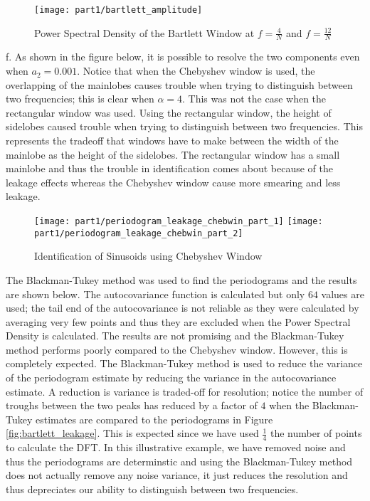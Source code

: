 \begin{figure}[H]
\centering{}
\texttt{[image: part1/bartlett\_amplitude]}
\caption{Power Spectral Density of the Bartlett Window at $f=\frac{4}{N}$ and $f=\frac{12}{N}$}
\end{figure}

\noindent{}f. As shown in the figure below, it is possible to resolve the two components even when $a_2=0.001$. Notice that when the Chebyshev window is used, the overlapping of the mainlobes causes trouble when trying to distinguish between two frequencies; this is clear when $\alpha=4$. This was not the case when the rectangular window was used. Using the rectangular window, the height of sidelobes caused trouble when trying to distinguish between two frequencies. This represents the tradeoff that windows have to make between the width of the mainlobe as the height of the sidelobes. The rectangular window has a small mainlobe and thus the trouble in identification comes about because of the leakage effects whereas the Chebyshev window cause more smearing and less leakage.

\begin{figure}[H]
\centering{}
\texttt{[image: part1/periodogram\_leakage\_chebwin\_part\_1]}
\texttt{[image: part1/periodogram\_leakage\_chebwin\_part\_2]}
\caption{Identification of Sinusoids using Chebyshev Window}
\end{figure}

\noindent{}The Blackman-Tukey method was used to find the periodograms and the results are shown below. The autocovariance function is calculated but only $64$ values are used; the tail end of the autocovariance is not reliable as they were calculated by averaging very few points and thus they are excluded when the Power Spectral Density is calculated. The results are not promising and the Blackman-Tukey method performs poorly compared to the Chebyshev window. However, this is completely expected. The Blackman-Tukey method is used to reduce the variance of the periodogram estimate by reducing the variance in the autocovariance estimate. A reduction is variance is traded-off for resolution; notice the number of troughs between the two peaks has reduced by a factor of $4$ when the Blackman-Tukey estimates are compared to the periodograms in Figure \ref{fig:bartlett_leakage}. This is expected since we have used $\frac{1}{4}$ the number of points to calculate the DFT. In this illustrative example, we have removed noise and thus the periodograms are determinstic and using the Blackman-Tukey method does not actually remove any noise variance, it just reduces the resolution and thus depreciates our ability to distinguish between two frequencies.

